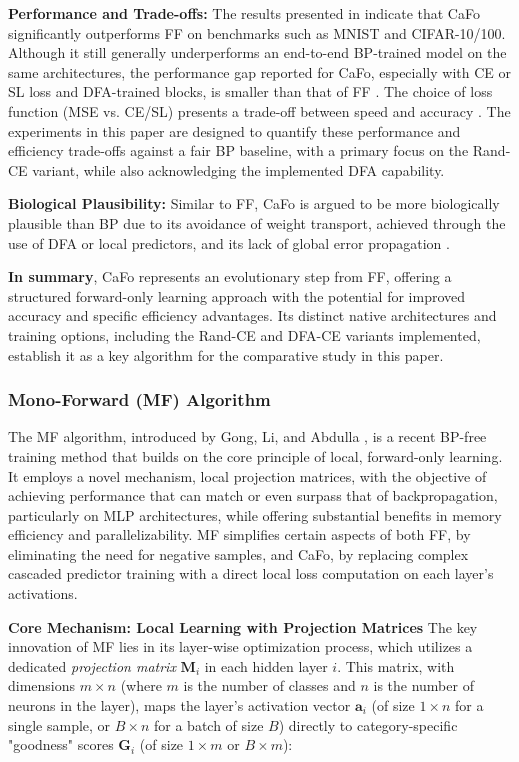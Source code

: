 \textbf{Performance and Trade-offs:}
The results presented in \cite{zhao2023cafo} indicate that CaFo significantly outperforms FF on benchmarks such as MNIST and CIFAR-10/100. Although it still generally underperforms an end-to-end BP-trained model on the same architectures, the performance gap reported for CaFo, especially with CE or SL loss and DFA-trained blocks, is smaller than that of FF \cite{zhao2023cafo}. The choice of loss function (MSE vs. CE/SL) presents a trade-off between speed and accuracy \cite{zhao2023cafo}. The experiments in this paper are designed to quantify these performance and efficiency trade-offs against a fair BP baseline, with a primary focus on the Rand-CE variant, while also acknowledging the implemented DFA capability.

\textbf{Biological Plausibility:}
Similar to FF, CaFo is argued to be more biologically plausible than BP due to its avoidance of weight transport, achieved through the use of DFA or local predictors, and its lack of global error propagation \cite{zhao2023cafo}.

\textbf{In summary}, CaFo represents an evolutionary step from FF, offering a structured forward-only learning approach with the potential for improved accuracy and specific efficiency advantages. Its distinct native architectures and training options, including the Rand-CE and DFA-CE variants implemented, establish it as a key algorithm for the comparative study in this paper.

\pagebreak

\subsubsection{Mono-Forward (MF) Algorithm}
\label{subsec:mf_algorithm_chap2}

The MF algorithm, introduced by Gong, Li, and Abdulla \cite{gong2025mono}, is a recent BP-free training method that builds on the core principle of local, forward-only learning. It employs a novel mechanism, local projection matrices, with the objective of achieving performance that can match or even surpass that of backpropagation, particularly on MLP architectures, while offering substantial benefits in memory efficiency and parallelizability. MF simplifies certain aspects of both FF, by eliminating the need for negative samples, and CaFo, by replacing complex cascaded predictor training with a direct local loss computation on each layer's activations.

\textbf{Core Mechanism: Local Learning with Projection Matrices}
The key innovation of MF lies in its layer-wise optimization process, which utilizes a dedicated \emph{projection matrix} $\mathbf{M}_i$ in each hidden layer $i$. This matrix, with dimensions $m \times n$ (where $m$ is the number of classes and $n$ is the number of neurons in the layer), maps the layer's activation vector $\mathbf{a}_i$ (of size $1 \times n$ for a single sample, or $B \times n$ for a batch of size $B$) directly to category-specific "goodness" scores $\mathbf{G}_i$ (of size $1 \times m$ or $B \times m$):


